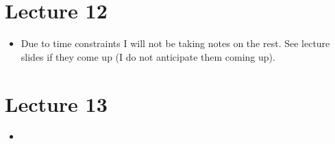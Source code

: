 \documentclass[11pt]{article} %
\begin{document}
\section{Lecture 12}
\begin{itemize}
\item Due to time constraints I will not be taking notes on the rest. See lecture slides if they come up (I do not anticipate them coming up).
\end{itemize}
\section{Lecture 13}
\begin{itemize}
\item 
\end{itemize}
\end{document}
